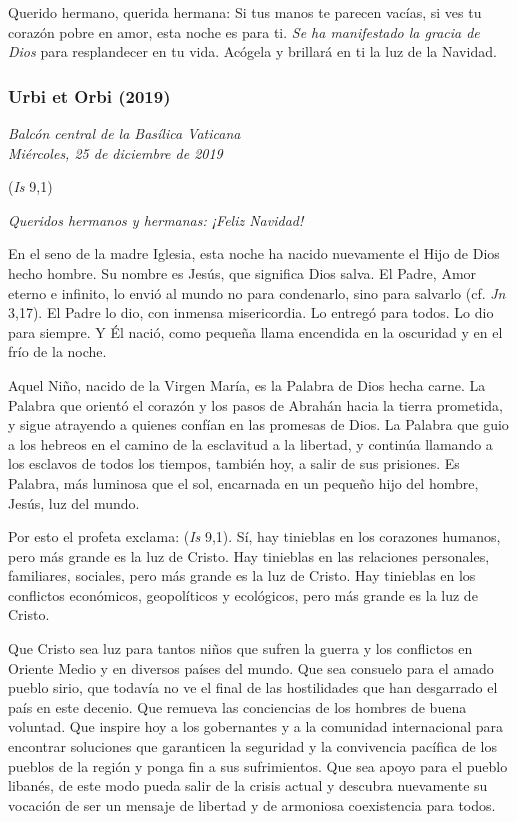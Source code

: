 Querido hermano, querida hermana: Si tus manos te parecen vacías, si ves tu corazón pobre en amor, esta noche es para ti. \emph{Se ha manifestado la gracia de Dios} para resplandecer en tu vida. Acógela y brillará en ti la luz de la Navidad.


\subsubsection{Urbi et Orbi (2019)} \emph{Balcón central de la Basílica Vaticana\\ Miércoles, 25 de diciembre de 2019}





 (\emph{Is} 9,1)

\emph{Queridos hermanos y hermanas: ¡Feliz Navidad!}

En el seno de la madre Iglesia, esta noche ha nacido nuevamente el Hijo de Dios hecho hombre. Su nombre es Jesús, que significa Dios salva. El Padre, Amor eterno e infinito, lo envió al mundo no para condenarlo, sino para salvarlo (cf. \emph{Jn} 3,17). El Padre lo dio, con inmensa misericordia. Lo entregó para todos. Lo dio para siempre. Y Él nació, como pequeña llama encendida en la oscuridad y en el frío de la noche.

Aquel Niño, nacido de la Virgen María, es la Palabra de Dios hecha carne. La Palabra que orientó el corazón y los pasos de Abrahán hacia la tierra prometida, y sigue atrayendo a quienes confían en las promesas de Dios. La Palabra que guio a los hebreos en el camino de la esclavitud a la libertad, y continúa llamando a los esclavos de todos los tiempos, también hoy, a salir de sus prisiones. Es Palabra, más luminosa que el sol, encarnada en un pequeño hijo del hombre, Jesús, luz del mundo.

Por esto el profeta exclama:  (\emph{Is} 9,1). Sí, hay tinieblas en los corazones humanos, pero más grande es la luz de Cristo. Hay tinieblas en las relaciones personales, familiares, sociales, pero más grande es la luz de Cristo. Hay tinieblas en los conflictos económicos, geopolíticos y ecológicos, pero más grande es la luz de Cristo.

Que Cristo sea luz para tantos niños que sufren la guerra y los conflictos en Oriente Medio y en diversos países del mundo. Que sea consuelo para el amado pueblo sirio, que todavía no ve el final de las hostilidades que han desgarrado el país en este decenio. Que remueva las conciencias de los hombres de buena voluntad. Que inspire hoy a los gobernantes y a la comunidad internacional para encontrar soluciones que garanticen la seguridad y la convivencia pacífica de los pueblos de la región y ponga fin a sus sufrimientos. Que sea apoyo para el pueblo libanés, de este modo pueda salir de la crisis actual y descubra nuevamente su vocación de ser un mensaje de libertad y de armoniosa coexistencia para todos.

